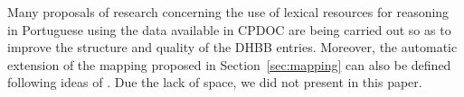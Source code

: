 
Many proposals of research concerning the use of lexical resources for
reasoning in Portuguese using the data available in CPDOC are being
carried out so as to improve the structure and quality of the DHBB
entries. Moreover, the automatic extension of the mapping proposed in
Section~\ref{sec:mapping} can also be defined following ideas of
\cite{onto-context}. Due the lack of space, we did not present in this
paper.

